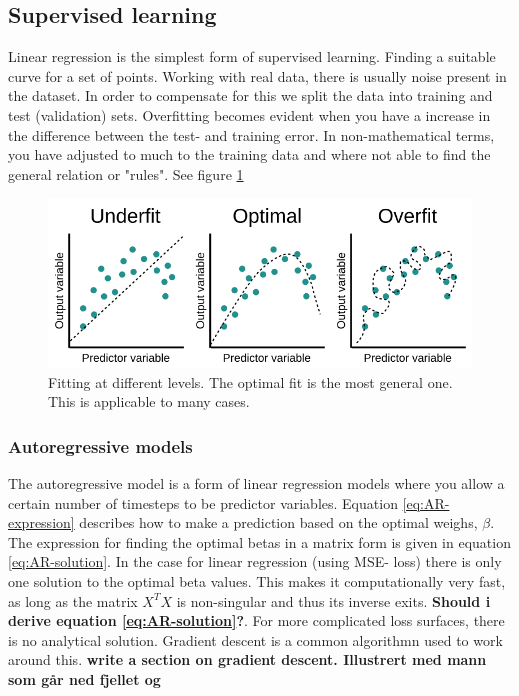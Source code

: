\subsection{Supervised learning} \label{sec:supervised_learning}
Linear regression is the simplest form of supervised learning. Finding a suitable curve for a set of points. Working with real data, there is usually noise present in the dataset. In order to compensate for this we split the data into training and test (validation) sets. Overfitting becomes evident when you have a increase in the difference between the test- and training error. In non-mathematical terms, you have adjusted to much to the training data and where not able to find the general relation or "rules". See figure \ref{fig:linreg_overfitting}

\begin{figure}[hp]
    \centering
    \includegraphics{Chapter2_Theory/images/linear_regression.png}
    \caption{Fitting at different levels. The optimal fit is the most general one. This is applicable to many cases.}
    \label{fig:linreg_overfitting}
\end{figure}

\subsubsection{Autoregressive models} \label{sec:ARmodels}
The autoregressive model is a form of linear regression models where you allow a certain number of timesteps to be predictor variables. Equation \eqref{eq:AR-expression} describes how to make a prediction based on the optimal weighs, $\beta$. The expression for finding the optimal betas in a matrix form is given in equation \eqref{eq:AR-solution}. In the case for linear regression (using MSE- loss) there is only one solution to the optimal beta values. This makes it computationally very fast, as long as the matrix $X^TX$ is non-singular and thus its inverse exits. \textbf{Should i derive equation \eqref{eq:AR-solution}?}. For more complicated loss surfaces, there is no analytical solution. Gradient descent is a common algorithmn used to work around this. \textbf{write a section on gradient descent. Illustrert med mann som går ned fjellet og } 

